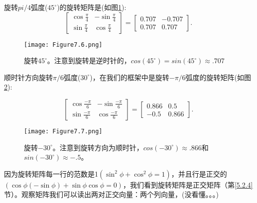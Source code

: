 \begin{example}
	旋转$pi / 4$弧度($45^{\circ}$)的旋转矩阵是(如图\ref{fig:7.6}):
	\begin{equation}
		\left[\begin{array}{cr}
			\cos \frac{\pi}{4} & -\sin \frac{\pi}{4} \\
			\sin \frac{\pi}{4} & \cos \frac{\pi}{4}
		\end{array}\right]=\left[\begin{array}{rr}
			0.707 & -0.707 \\
			0.707 & 0.707
		\end{array}\right] \text {. }
	\end{equation}
	
	\begin{figure}[htbp]
		\centering
		\texttt{[image: Figure7.6.png]}
		\caption{旋转$45^{\circ}$。注意到旋转是逆时针的，$cos(45^{\circ}) = sin(45^{\circ}) \approx .707 $}
		\label{fig:7.6}
	\end{figure}	
	
	顺时针方向旋转$\pi / 6$弧度($30^{\circ}$)，在我们的框架中是旋转$-\pi / 6$弧度的旋转矩阵(如图\ref{fig:7.7}):
	
	\begin{equation}
		\left[\begin{array}{cr}
			\cos \frac{-\pi}{6} & -\sin \frac{-\pi}{6} \\
			\sin \frac{-\pi}{6} & \cos \frac{-\pi}{6}
		\end{array}\right]=\left[\begin{array}{rr}
			0.866 & 0.5 \\
			-0.5 & 0.866
		\end{array}\right] \text {. }
	\end{equation}
	
	\begin{figure}[htbp]
		\centering
		\texttt{[image: Figure7.7.png]}
		\caption{旋转$-30^{\circ}$。注意到旋转方向为顺时针，$cos(-30^{\circ}) \approx .866 $和$sin(-30^{\circ}) \approx -.5 $。}
		\label{fig:7.7}
	\end{figure}	
	
	
\end{example}

因为旋转矩阵每一行的范数是1$\left(\sin ^2 \phi+\cos ^2 \phi=1\right)$，并且行是正交的$(\cos \phi(-\sin \phi)+\sin \phi \cos \phi=0)$，我们看到旋转矩阵是正交矩阵（第\ref{5.2.4}节）。观察矩阵我们可以读出两对正交向量：两个列向量，(没看懂。。。)

